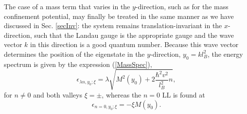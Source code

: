 \documentclass[10pt]{book}
\newcommand{\beq}{\begin{equation}}
\newcommand{\eeq}{\end{equation}}
\begin{document}
The case of a mass term that varies in the $y$-direction, such as for the mass confinement potential, may finally
be treated in the same manner as we have discussed in Sec. \ref{secInv}: the system remains translation-invariant in
the $x$-direction, such that the Landau gauge is the appropriate gauge and the wave vector $k$ in this direction
is a good quantum number. Because this wave vector determines the position of the eigenstate in the $y$-direction,
$y_0=kl_B^2$, the energy spectrum is given by the expression (\ref{MassSpec}),
\beq\label{MassSpecA}
\epsilon_{\lambda n,y_0;\xi} = \lambda \sqrt{M^2(y_0) + 2\frac{\hbar^2 v^2}{l_B^2} n}, 
\eeq
for $n\neq 0$ and both valleys $\xi=\pm$, whereas the $n=0$ LL is found at 
\beq\label{MassSpec0}
\epsilon_{n=0,y_0;\xi} = -\xi M(y_0).
\eeq



\clearpage





 
 

\end{document}
